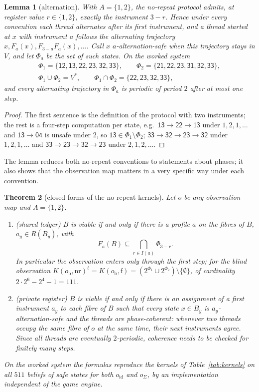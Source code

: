 \documentclass[11pt,a4paper]{article}
\theoremstyle{plain}
\newtheorem{theorem}{Theorem}[section]
\newtheorem{lemma}[theorem]{Lemma}
\theoremstyle{definition}
\theoremstyle{remark}
\newcommand{\Vstar}{V^{\ast}}
\newcommand{\st}[1]{\mathsf{#1}}
\newcommand{\led}{\ell}
\newcommand{\free}{\mathrm{f}}
\newcommand{\nr}{\mathrm{nr}}
\newcommand{\ofull}{o_{\mathrm{id}}}
\newcommand{\oagg}{o_{\Sigma}}
\newcommand{\oblind}{o_{\mathrm{b}}}
\begin{document}
\begin{lemma}[alternation]\label{lem:alt}
With $A=\{1,2\}$, the no-repeat protocol admits, at register value $r\in\{1,2\}$, exactly the instrument $3-r$. Hence under every convention each thread alternates after its first instrument, and a thread started at $x$ with instrument $a$ follows the \emph{alternating trajectory} $x,F_a(x),F_{3-a}F_a(x),\dots$. Call $x$ \emph{$a$-alternation-safe} when this trajectory stays in $V$, and let $\Phi_a$ be the set of such states. On the worked system
\begin{gather*}
\Phi_1=\{\st{12},\st{13},\st{22},\st{23},\st{32},\st{33}\},\qquad
\Phi_2=\{\st{21},\st{22},\st{23},\st{31},\st{32},\st{33}\},\\
\Phi_1\cup\Phi_2=\Vstar,\qquad \Phi_1\cap\Phi_2=\{\st{22},\st{23},\st{32},\st{33}\},
\end{gather*}
and every alternating trajectory in $\Phi_a$ is periodic of period $2$ after at most one step.
\end{lemma}

\begin{proof}
The first sentence is the definition of the protocol with two instruments; the rest is a four-step computation per state, e.g.\ $\st{13}\to\st{22}\to\st{13}$ under $1,2,1,\dots$ and $\st{13}\to\st{04}$ is unsafe under $2$, so $\st{13}\in\Phi_1\setminus\Phi_2$; $\st{33}\to\st{32}\to\st{23}\to\st{32}$ under $1,2,1,\dots$ and $\st{33}\to\st{23}\to\st{32}\to\st{23}$ under $2,1,2,\dots$.
\end{proof}

The lemma reduces both no-repeat conventions to statements about phases; it also shows that the observation map matters in a very specific way under each convention.

\begin{theorem}[closed forms of the no-repeat kernels]\label{thm:closed}
Let $o$ be any observation map and $A=\{1,2\}$.
\begin{enumerate}[label=(\alph*),leftmargin=2em,itemsep=1pt]
\item (\emph{shared ledger}) $B$ is viable if and only if there is a profile $a$ on the fibres of $B$, $a_y\in R(B_y)$, with
\[
F_a(B)\subseteq\bigcap_{r\in I(a)}\Phi_{3-r}.
\]
In particular the observation enters only through the first step; for the blind observation $K(\oblind,\nr)^{\led}=K(\oblind,\free)=(2^{\Phi_1}\cup 2^{\Phi_2})\setminus\{\emptyset\}$, of cardinality $2\cdot 2^{6}-2^{4}-1=111$.
\item (\emph{private register}) $B$ is viable if and only if there is an assignment of a first instrument $a_y$ to each fibre of $B$ such that every state $x\in B_y$ is $a_y$-alternation-safe and the threads are \emph{phase-coherent}: whenever two threads occupy the same fibre of $o$ at the same time, their next instruments agree. Since all threads are eventually $2$-periodic, coherence needs to be checked for finitely many steps.
\end{enumerate}
On the worked system the formulas reproduce the kernels of Table~\ref{tab:kernels} on all $511$ beliefs of safe states for both $\ofull$ and $\oagg$, by an implementation independent of the game engine.
\end{theorem}
\end{document}
